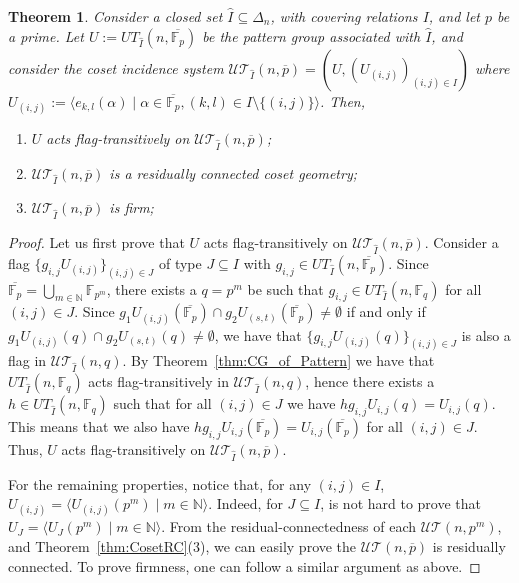 \documentclass[11pt,letterpaper]{amsart}
\newtheorem{theorem}{Theorem}[section]
\newcommand{\TT}{\mathcal{T}}
\newcommand{\FF}{\mathbb{F}}
\newcommand{\UU}{\mathcal{U}}
\begin{document}
\begin{theorem}\label{thm:CG_of_Pattern_Fecho}
    Consider a closed set $\widehat{I}\subseteq \Delta_n$, with covering relations $I$, and let $p$ be a prime.
    Let $U:=UT_{\widehat{I}}(n,\overline{\FF_p})$ be the pattern group associated with $\widehat{I}$, and consider the coset incidence system $\UU\TT_{\widehat{I}}(n,\overline{p})=(U,(U_{(i,j)})_{(i,j)\in I})$ where $U_{(i,j)} := \langle e_{k,l}(\alpha) \mid \alpha\in \overline{\FF_p}, (k,l)\in I\setminus\{(i,j)\} \rangle$. Then,
    \begin{enumerate}
        \item $U$ acts flag-transitively on $\UU\TT_{\widehat{I}}(n,\overline{p})$;
        \item $\UU\TT_{\widehat{I}}(n,\overline{p})$ is a residually connected coset geometry;
        \item $\UU\TT_{\widehat{I}}(n,\overline{p})$ is firm;
    \end{enumerate}
\end{theorem}
\begin{proof}

    Let us first prove that $U$ acts flag-transitively on $\UU\TT_{\widehat{I}}(n,\overline{p})$. Consider a flag $\{g_{i,j}U_{(i,j)}\}_{(i,j)\in J}$ of type $J\subseteq I$ with $g_{i,j}\in  UT_{\widehat{I}}(n,\overline{\FF_p})$.
    Since $\overline{\FF_p}=\bigcup_{m\in\mathbb{N}}\FF_{p^m}$, there exists a $q=p^m$ be such that $g_{i,j}\in  UT_{\widehat{I}}(n,\FF_q)$ for all $(i,j)\in J$. Since $g_1U_{(i,j)}(\overline{\FF_p})\cap g_2U_{(s,t)}(\overline{\FF_p})\neq \emptyset$ if and only if $g_1U_{(i,j)}(q)\cap g_2U_{(s,t)}(q)\neq \emptyset$, we have that $\{g_{i,j}U_{(i,j)}(q)\}_{(i,j)\in J}$ is also a flag in $\UU\TT_{\widehat{I}}(n,q)$. 
    By Theorem~\ref{thm:CG_of_Pattern} we have that $UT_{\widehat{I}}(n,\FF_q)$ acts flag-transitively in $\UU\TT_{\widehat{I}}(n,q)$, hence there exists a $h\in UT_{\widehat{I}}(n,\FF_q)$ such that for all $(i,j)\in J$ we have $hg_{i,j}U_{i,j}(q)=U_{i,j}(q)$. This means that we also have $hg_{i,j}U_{i,j}(\overline{\FF_p})=U_{i,j}(\overline{\FF_p})$ for all $(i,j)\in J$. Thus, $U$ acts flag-transitively on $\UU\TT_{\widehat{I}}(n,\overline{p})$.

    For the remaining properties, notice that, for any $(i,j) \in I$, $U_{(i,j)}= \langle U_{(i,j)}(p^m) \mid m \in \mathbb{N}\rangle$. Indeed, for $J\subseteq I$,  is not hard to prove that $U_J = \langle U_J(p^m) \mid m\in \mathbb{N} \rangle$. From the residual-connectedness of each $\UU\TT(n,p^m)$, and Theorem~\ref{thm:CosetRC}(3), we can easily prove the $\UU\TT(n,\overline{p})$ is residually connected.
    To prove firmness, one can follow a similar argument as above.


\end{proof}


\end{document}

